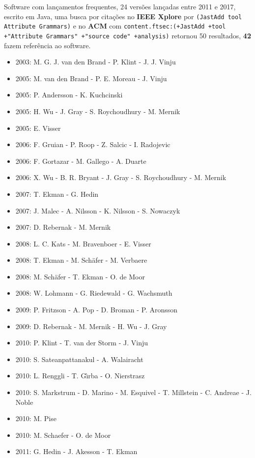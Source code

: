 Software com lançamentos frequentes,
24 versões lançadas
entre 2011 e 2017,
escrito em Java,
uma busca por citações no {\bf IEEE Xplore} por
\texttt{(JastAdd tool Attribute Grammars)}
e no {\bf ACM} com
\texttt{content.ftsec:(+JastAdd +tool +"Attribute Grammars" +"source code" +analysis)}
retornou
50 resultados,
{\bf 42} fazem referência ao software.

\begin{itemize}
\item 2003: M. G. J. van den Brand - P. Klint - J. J. Vinju
\item 2005: M. van den Brand - P. E. Moreau - J. Vinju
\item 2005: P. Andersson - K. Kuchcinski
\item 2005: H. Wu - J. Gray - S. Roychoudhury - M. Mernik
\item 2005: E. Visser
\item 2006: F. Gruian - P. Roop - Z. Salcic - I. Radojevic
\item 2006: F. Gortazar - M. Gallego - A. Duarte
\item 2006: X. Wu - B. R. Bryant - J. Gray - S. Roychoudhury - M. Mernik
\item 2007: T. Ekman - G. Hedin
\item 2007: J. Malec - A. Nilsson - K. Nilsson - S. Nowaczyk
\item 2007: D. Rebernak - M. Mernik
\item 2008: L. C. Kats - M. Bravenboer - E. Visser
\item 2008: T. Ekman - M. Sch\"{a}fer - M. Verbaere
\item 2008: M. Sch\"{a}fer - T. Ekman - O. de Moor
\item 2008: W. Lohmann - G. Riedewald - G. Wachsmuth
\item 2009: P. Fritzson - A. Pop - D. Broman - P. Aronsson
\item 2009: D. Rebernak - M. Mernik - H. Wu - J. Gray
\item 2010: P. Klint - T. van der Storm - J. Vinju
\item 2010: S. Sateanpattanakul - A. Walairacht
\item 2010: L. Renggli - T. G\^{\i}rba - O. Nierstrasz
\item 2010: S. Markstrum - D. Marino - M. Esquivel - T. Millstein - C. Andreae - J. Noble
\item 2010: M. Pise
\item 2010: M. Schaefer - O. de Moor
\item 2011: G. Hedin - J. Akesson - T. Ekman

\end{itemize}
